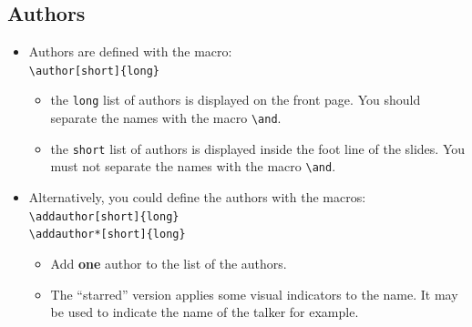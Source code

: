 \documentclass[english,circlenumberstyle]{irtesbeamer}
\begin{document}
\subsection{Authors}
\begin{frame}{\subsecname}
	\begin{itemize}
	\item Authors are defined with the macro: \\
		\texttt{{\textbackslash}author[short]\{long\}}
		\begin{itemize}
		\item the \texttt{long} list of authors is displayed on the front page. You should separate the names with the macro \texttt{{\textbackslash}and}.
		\item the \texttt{short} list of authors is displayed inside the foot line of the slides. You \alert{must not separate} the names with the macro \texttt{{\textbackslash}and}.
		\end{itemize}
	\item Alternatively, you could define the authors with the macros: \\
		\texttt{{\textbackslash}addauthor[short]\{long\}} \\
		\texttt{{\textbackslash}addauthor*[short]\{long\}}
		\begin{itemize}
		\item Add \textbf{one} author to the list of the authors.
		\item The ``starred'' version applies some visual indicators to the name. It may be used to indicate the name of the talker for example.
		\end{itemize}
	\end{itemize}
\end{frame}
\end{document}
